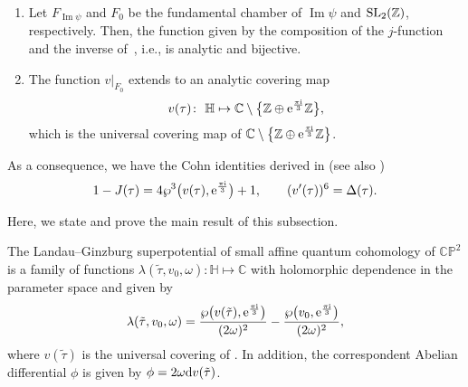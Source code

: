 \begin{enumerate}
Then, the function  is invariant with respect the $\operatorname{Im} \psi$ action.
\item[(6)] Let $F_{\operatorname{Im}\psi}$ and $F_0$ be the fundamental chamber of $\operatorname{Im}\psi$ and ${\rm SL}_2(\mathbb{Z})$, respectively. Then, the function
given by the composition of the $j$-function and the inverse of~, i.e.,
is analytic and bijective.
\item[(7)]
The function $v\big|_{F_0}$ extends to an analytic covering map
\begin{gather}\label{universal covering map equiharmonic lattice 2}
v(\tau)\colon \ \mathbb{H}\mapsto \mathbb{C}\setminus\bigl\{ \mathbb{Z}\oplus {\rm e}^{\frac{\pi {\rm i}}{3}}\mathbb{Z}\bigr\} ,
\end{gather}
which is the universal covering map of $ \mathbb{C}\setminus\bigl\{ \mathbb{Z}\oplus {\rm e}^{\frac{\pi {\rm i}}{3}}\mathbb{Z}\bigr\} $.
\end{enumerate}

As a consequence, we have the Cohn identities derived in \cite[Section 9]{Cohn} (see also \cite{M.Batchelor,Golubev})
\begin{gather}
1-J(\tau)=4\wp^3\bigl(v(\tau),{\rm e}^{\frac{\pi {\rm i}}{3}}\bigr)+1,\qquad
(v^{\prime}(\tau))^6=\Delta(\tau).\label{universal covering map equiharmonic lattice}
\end{gather}

Here, we state and prove the main result of this subsection.

\begin{Theorem}
The Landau--Ginzburg superpotential of small affine quantum cohomology of $\mathbb{CP}^2$ is a family of functions
$
\lambda(\tilde\tau, v_0, \omega)\colon \mathbb{H} \mapsto \mathbb{C}
$
with holomorphic dependence in the parameter space
 and given by
\begin{gather*}
\lambda(\tilde\tau,v_0,\omega)=\frac{\wp\bigl(v(\tilde\tau),{\rm e}^{\frac{\pi {\rm i} }{3}}\bigr)}{(2\omega)^2}-\frac{\wp\bigl(v_0,{\rm e}^{\frac{\pi {\rm i} }{3}}\bigr)}{(2\omega)^2},
\end{gather*}
where $v(\tilde\tau)$ is the universal covering of .
 In addition, the correspondent Abelian differential $\phi$ is given by
$
\phi=2\omega {\rm d}v(\tilde\tau)$.

\end{Theorem}

